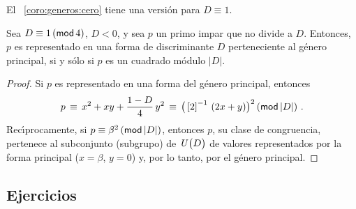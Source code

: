 El \coroname~\ref{coro:generos:cero} tiene una versi\'on para $D\equiv 1$.

\begin{coroGenerosB}\label{coro:generos:uno}
	Sea $D\equiv 1\tmodulo[4]$, $D<0$, y sea $p$ un primo impar
	que no divide a $D$. Entonces, $p$ es representado en una
	forma de discriminante $D$ perteneciente al g\'enero principal,
	si y s\'olo si $p$ es un cuadrado m\'odulo $|D|$.
\end{coroGenerosB}

\begin{proof}
	Si $p$ es representado en una forma del g\'enero principal,
	entonces
	\begin{displaymath}
		p\,\equiv\,x^2+xy+\frac{1-D} 4\,y^2
			\,\equiv\,\big(\clase 2^{-1}\,(2x+y)\big)^2
			\tmodulo[|D|]
		\dispstop
	\end{displaymath}
	Rec\'{\i}procamente, si $p\equiv\beta^2\tmodulo[|D|]$,
	entonces $p$, su clase de congruencia,
	pertenece al subconjunto (subgrupo) de $\Unidadesmod[D]$
	de valores representados por la forma principal
	($x=\beta$, $y=0$) y, por lo tanto, por el g\'enero principal.
\end{proof}

\subsection*{Ejercicios}


